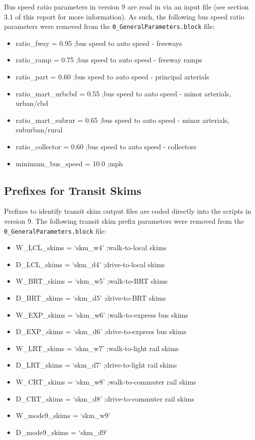 \documentclass[
  letterpaper,
  DIV=11,
  numbers=noendperiod]{scrreprt}
\providecommand{\tightlist}{%
  \setlength{\itemsep}{0pt}\setlength{\parskip}{0pt}}\usepackage{longtable,booktabs,array}
\begin{document}
Bus speed ratio parameters in version 9 are read in via an input file
(see section 3.1 of this report for more information). As such, the
following bus speed ratio parameters were removed from the
\texttt{0\_GeneralParameters.block} file:

\begin{itemize}
\tightlist
\item
  ratio\_fway = 0.95 ;bus speed to auto speed - freeways
\item
  ratio\_ramp = 0.75 ;bus speed to auto speed - freeway ramps
\item
  ratio\_part = 0.60 ;bus speed to auto speed - principal arterials
\item
  ratio\_mart\_urbcbd = 0.55 ;bus speed to auto speed - minor arterials,
  urban/cbd
\item
  ratio\_mart\_subrur = 0.65 ;bus speed to auto speed - minor arterials,
  suburban/rural
\item
  ratio\_collector = 0.60 ;bus speed to auto speed - collectors
\item
  minimum\_bus\_speed = 10.0 ;mph
\end{itemize}

\hypertarget{prefixes-for-transit-skims}{%
\subsection{Prefixes for Transit
Skims}\label{prefixes-for-transit-skims}}

Prefixes to identify transit skim output files are coded directly into
the scripts in version 9. The following transit skim prefix parameters
were removed from the \texttt{0\_GeneralParameters.block} file:

\begin{itemize}
\tightlist
\item
  W\_LCL\_skims = `skm\_w4' ;walk-to-local skims
\item
  D\_LCL\_skims = `skm\_d4' ;drive-to-local skims
\item
  W\_BRT\_skims = `skm\_w5' ;walk-to-BRT skims
\item
  D\_BRT\_skims = `skm\_d5' ;drive-to-BRT skims
\item
  W\_EXP\_skims = `skm\_w6' ;walk-to-express bus skims
\item
  D\_EXP\_skims = `skm\_d6' ;drive-to-express bus skims
\item
  W\_LRT\_skims = `skm\_w7' ;walk-to-light rail skims
\item
  D\_LRT\_skims = `skm\_d7' ;drive-to-light rail skims
\item
  W\_CRT\_skims = `skm\_w8' ;walk-to-commuter rail skims
\item
  D\_CRT\_skims = `skm\_d8' ;drive-to-commuter rail skims
\item
  W\_mode9\_skims = `skm\_w9'
\item
  D\_mode9\_skims = `skm\_d9'
\end{itemize}
\end{document}
